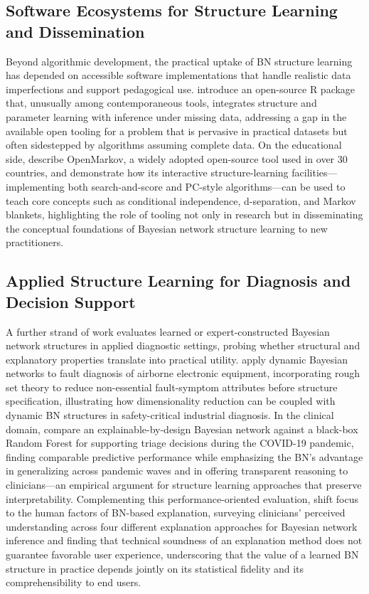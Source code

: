 \subsection{Software Ecosystems for Structure Learning and Dissemination}
Beyond algorithmic development, the practical uptake of BN structure learning has depended on accessible software implementations that handle realistic data imperfections and support pedagogical use. \cite{franzin2016bnstruct} introduce an open-source R package that, unusually among contemporaneous tools, integrates structure and parameter learning with inference under missing data, addressing a gap in the available open tooling for a problem that is pervasive in practical datasets but often sidestepped by algorithms assuming complete data. On the educational side, \cite{diez2022teaching} describe OpenMarkov, a widely adopted open-source tool used in over 30 countries, and demonstrate how its interactive structure-learning facilities---implementing both search-and-score and PC-style algorithms---can be used to teach core concepts such as conditional independence, d-separation, and Markov blankets, highlighting the role of tooling not only in research but in disseminating the conceptual foundations of Bayesian network structure learning to new practitioners.

\subsection{Applied Structure Learning for Diagnosis and Decision Support}
A further strand of work evaluates learned or expert-constructed Bayesian network structures in applied diagnostic settings, probing whether structural and explanatory properties translate into practical utility. \cite{chen2023fault} apply dynamic Bayesian networks to fault diagnosis of airborne electronic equipment, incorporating rough set theory to reduce non-essential fault-symptom attributes before structure specification, illustrating how dimensionality reduction can be coupled with dynamic BN structures in safety-critical industrial diagnosis. In the clinical domain, \cite{nicora2024bayesian} compare an explainable-by-design Bayesian network against a black-box Random Forest for supporting triage decisions during the COVID-19 pandemic, finding comparable predictive performance while emphasizing the BN's advantage in generalizing across pandemic waves and in offering transparent reasoning to clinicians---an empirical argument for structure learning approaches that preserve interpretability. Complementing this performance-oriented evaluation, \cite{butz2022investigating} shift focus to the human factors of BN-based explanation, surveying clinicians' perceived understanding across four different explanation approaches for Bayesian network inference and finding that technical soundness of an explanation method does not guarantee favorable user experience, underscoring that the value of a learned BN structure in practice depends jointly on its statistical fidelity and its comprehensibility to end users.

